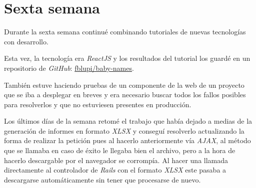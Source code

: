 \section{Sexta semana}

Durante la sexta semana continué combinando tutoriales de nuevas tecnologías con desarrollo.

Esta vez, la tecnología era \textit{ReactJS} \cite{youtube-react} y los resultados del tutorial los guardé en un repositorio de \textit{GitHub}: \href{https://github.com/fblupi/baby-names}{fblupi/baby-names}.

También estuve haciendo pruebas de un componente de la web de un proyecto que se iba a desplegar en breves y era necesario buscar todos los fallos posibles para resolverlos y que no estuviesen presentes en producción.

Los últimos días de la semana retomé el trabajo que había dejado a medias de la generación de informes en formato \textit{XLSX} y conseguí resolverlo actualizando la forma de realizar la petición pues al hacerlo anteriormente vía \textit{AJAX}, al método que se llamaba en caso de éxito le llegaba bien el archivo, pero a la hora de hacerlo descargable por el navegador se corrompía. Al hacer una llamada directamente al controlador de \textit{Rails} con el formato \textit{XLSX} este pasaba a descargarse automáticamente sin tener que procesarse de nuevo.
